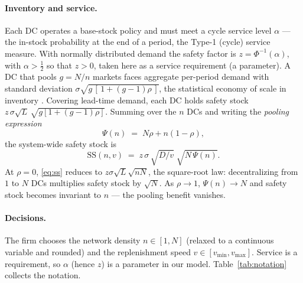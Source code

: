 \documentclass[11pt]{article}
\theoremstyle{definition}
\theoremstyle{remark}
\theoremstyle{plain}
\newcommand{\sstock}{\mathrm{SS}}
\begin{document}
\paragraph{Inventory and service.} Each DC operates a base-stock policy and must meet a cycle service level
$\alpha$ --- the in-stock probability at the end of a period, the Type-1 (cycle) service measure. With normally distributed demand the safety factor is $z = \Phi^{-1}(\alpha)$, with $\alpha>\tfrac12$ so
that $z>0$, taken here as a service requirement (a parameter). A DC that pools $g = N/n$ markets faces aggregate per-period demand with
standard deviation $\sigma\sqrt{g\,[\,1+(g-1)\rho\,]}$, the statistical economy of scale in inventory
\citep{eppen1979effects}. Covering lead-time demand, each DC holds safety stock
$z\,\sigma\sqrt{L}\,\sqrt{g[1+(g-1)\rho]}$. Summing over the $n$ DCs and writing the \emph{pooling
expression}
\begin{equation}\label{eq:psi}
  \Psi(n) \;=\; N\rho + n(1-\rho),
\end{equation}
the system-wide safety stock is
\begin{equation}\label{eq:ss}
  \sstock(n,v) \;=\; z\,\sigma\,\sqrt{D/v}\;\sqrt{N\,\Psi(n)} .
\end{equation}
At $\rho = 0$, \eqref{eq:ss} reduces to $z\sigma\sqrt{L}\sqrt{nN}$, the square-root law: decentralizing
from $1$ to $N$ DCs multiplies safety stock by $\sqrt{N}$. As $\rho \to 1$, $\Psi(n) \to N$ and safety stock
becomes invariant to $n$ --- the pooling benefit vanishes.

\paragraph{Decisions.} The firm chooses the network density $n \in [1,N]$ (relaxed to a continuous
variable and rounded) and the replenishment speed $v \in [v_{\min}, v_{\max}]$. Service is a requirement,
so $\alpha$ (hence $z$) is a parameter in our model. Table~\ref{tab:notation} collects the notation.
\end{document}

